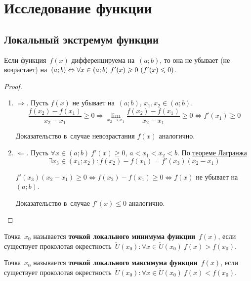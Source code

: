 \section{Исследование функции}
\subsection{Локальный экстремум функции}
\begin{theorem}
\label{th:criterion_of_monotonic_function}
Если функция~$f(x)$ дифференцируема на~$(a; b)$, то она не убывает (не возрастает) на~$(a; b) \opbr\Leftrightarrow \forall x \in (a; b) \ f'(x) \geqslant 0 \ (f'(x) \leqslant 0)$.
\end{theorem}
\begin{proof}
\begin{enumerate}
	\item $\Rightarrow$. Пусть $f(x)$ не убывает на~$(a; b)$, $x_1, x_2 \in (a; b)$.
	\begin{equation*}
	\frac{f(x_2) - f(x_1)}{x_2 - x_1} \geqslant 0 \Rightarrow
	\lim_{x_2 \to x_1} \frac{f(x_2) - f(x_1)}{x_2 - x_1} \geqslant 0 \Leftrightarrow
	f'(x_1) \geqslant 0
	\end{equation*}
	
	Доказательство в~случае невозрастания $f(x)$ аналогично.
	
	\item $\Leftarrow$. Пусть $\forall x \in (a; b) \ f'(x) \geqslant 0$, $a < x_1 < x_2 < b$.
	По \hyperref[th:mean_value]{теореме Лагранжа}
	\begin{equation*}
	\exists x_3 \in (x_1; x_2) \colon f(x_2) - f(x_1) = f'(x_3)(x_2 - x_1)
	\end{equation*}
	
	$f'(x_3)(x_2 - x_1) \geqslant 0 \Leftrightarrow
	f(x_2) - f(x_1) \geqslant 0 \Leftrightarrow
	f(x)$ не убывает на~$(a; b)$.
	
	Доказательство в~случае $f'(x) \leqslant 0$ аналогично.
\end{enumerate}
\end{proof}

 Точка~$x_0$ называется \textbf{точкой локального минимума функции}~$f(x)$, если существует проколотая окрестность~$\breve U(x_0) \colon \forall x \in \breve U(x_0) \ f(x) > f(x_0)$.

 Точка~$x_0$ называется \textbf{точкой локального максимума функции}~$f(x)$, если существует проколотая окрестность~$\breve U(x_0) \colon \forall x \in \breve U(x_0) \ f(x) < f(x_0)$.

